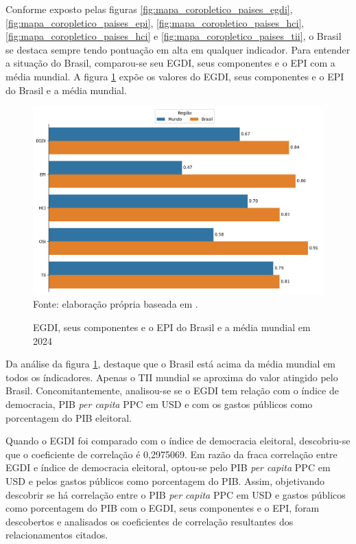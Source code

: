 Conforme exposto pelas figuras \ref{fig:mapa_coropletico_paises_egdi}, \ref{fig:mapa_coropletico_paises_epi}, \ref{fig:mapa_coropletico_paises_hci}, \ref{fig:mapa_coropletico_paises_hci} e \ref{fig:mapa_coropletico_paises_tii}, o Brasil se destaca sempre tendo pontuação em alta em qualquer indicador. Para entender a situação do Brasil, comparou-se seu EGDI, seus componentes e o EPI com a média mundial. A figura \ref{fig:comparacao_egdi_brasil_mundo} expõe os valores do EGDI, seus componentes e o EPI do Brasil e a média mundial.

\begin{figure}[H]
	\centering
	\caption{EGDI, seus componentes e o EPI do Brasil e a média mundial em 2024}
	\includegraphics[width=1\linewidth]{figuras/comparacao_egdi_brasil_mundo}
	\label{fig:comparacao_egdi_brasil_mundo}
	\footnotesize{Fonte: elaboração própria baseada em \cite{ONU_EGDI_mapa}.}
\end{figure}

Da análise da figura \ref{fig:comparacao_egdi_brasil_mundo}, destaque que o Brasil está acima da média mundial em todos os índicadores. Apenas o TII mundial se aproxima do valor atingido pelo Brasil. Concomitantemente, analisou-se se o EGDI tem relação com o índice de democracia, PIB \textit{per capita} PPC em USD e com os gastos públicos como porcentagem do PIB eleitoral.

Quando o EGDI foi comparado com o índice de democracia eleitoral, descobriu-se que o coeficiente de correlação é 0,2975069. Em razão da fraca correlação entre EGDI e índice de democracia eleitoral, optou-se pelo PIB \textit{per capita} PPC em USD e pelos gastos públicos como porcentagem do PIB. Assim, objetivando descobrir se há correlação entre o PIB \textit{per capita} PPC em USD e gastos públicos como porcentagem do PIB com o EGDI, seus componentes e o EPI, foram descobertos e analisados os coeficientes de correlação resultantes dos relacionamentos citados.

